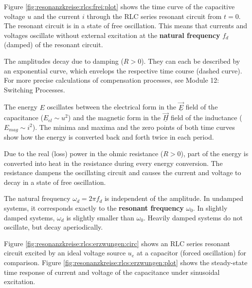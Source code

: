 \begin{frame}
{    Figure \ref{fig:resonanzkreise:rlcs:frei:plot} shows the time curve of the capacitive voltage $u$
    and the current $i$ through the RLC series resonant circuit from $t=0$. %
    The resonant circuit is in a state of free oscillation.
    This means that currents and voltages oscillate without external excitation at the \textbf{natural frequency} $f_d$ 
    (damped) of the resonant circuit.

    The amplitudes decay due to damping ($R>0$).
    They can each be described by an exponential curve,
    which envelops the respective time course (dashed curve).
    For more precise calculations of compensation processes, see Module 12: Switching Processes.%

    The energy $E$ oscillates between 
    the electrical form in the $\vec{\underline{E}}$ field of the capacitance ($E_{el} \sim u^2$) and 
    the magnetic form in the $\vec{\underline{H}}$ field of the inductance ($E_{mag} \sim i^2$).
    The minima and maxima and the zero points of both time curves show how the energy is converted 
    back and forth twice in each period. 

    Due to the real (loss) power in the ohmic resistance ($R > 0$), 
    part of the energy is converted into heat in the resistance during every energy conversion.
    The resistance dampens the oscillating circuit and causes the current and voltage to decay in a state of free oscillation.

    The natural frequency $\omega_d = 2\pi f_d$ is independent of the amplitude.
    In undamped systems, it corresponds exactly to the \textbf{resonant frequency} $\omega_0$.
    In slightly damped systems, $\omega_d$ is slightly smaller than $\omega_0$.
    Heavily damped systems do not oscillate, but decay aperiodically.

    Figure \ref{fig:resonanzkreise:rlcs:erzwungen:circ} shows an RLC series resonant circuit
    excited by an ideal voltage source $u_e$ at a capacitor (forced oscillation) for comparison.
    Figure \ref{fig:resonanzkreise:rlcs:erzwungen:plot} shows the steady-state time response 
    of current and voltage of the capacitance under sinusoidal excitation.
 

}
\end{frame}

